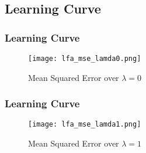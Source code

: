 \documentclass{beamer}
\begin{document}
\subsection{Learning Curve}
\begin{frame}
    \frametitle{Learning Curve}
    \begin{figure}[!ht]
		\centering
		\texttt{[image: lfa\_mse\_lamda0.png]}
		\caption{Mean Squared Error over $\lambda=0$}
	\end{figure}
\end{frame}
\begin{frame}
    \frametitle{Learning Curve}
    \begin{figure}[!ht]
		\centering
		\texttt{[image: lfa\_mse\_lamda1.png]}
		\caption{Mean Squared Error over $\lambda=1$}
	\end{figure}
\end{frame}
\end{document}
